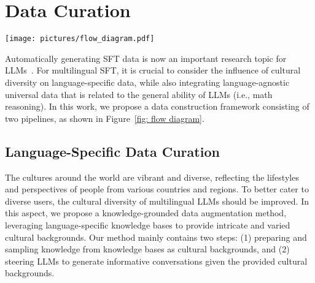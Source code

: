 \documentclass[11pt]{article}
\begin{document}
\section{Data Curation}
\begin{figure*}[t]
    \centering
    \texttt{[image: pictures/flow\_diagram.pdf]}
    \caption{The proposed data augmentation method consists of two pipelines. The upper pipeline illustrates the generation of language-specific chat data. Dialogues are generated by LLMs, conditioning on language-specific knowledge extracted from Wikipedia. The language-agnostic pipeline aims to leverage existing high-quality English SFT data, using a two-stage translation mechanism to mitigate translation errors stemming from cultural differences.}
    \label{fig: flow diagram}
\end{figure*}

Automatically generating SFT data is now an important research topic for LLMs~\cite{alpaca,wang-etal-2023-self-instruct,ding-etal-2023-enhancing}. For multilingual SFT, it is crucial to consider the influence of cultural diversity on language-specific data, while also integrating language-agnostic universal data that is related to the general ability of LLMs (i.e., math reasoning). In this work, we propose a data construction framework consisting of two pipelines, as shown in Figure~\ref{fig: flow diagram}. 

\subsection{Language-Specific Data Curation}

The cultures around the world are vibrant and diverse, reflecting the lifestyles and perspectives of people from various countries and regions. To better cater to diverse users, the cultural diversity of multilingual LLMs should be improved. In this aspect, we propose a knowledge-grounded data augmentation method, leveraging language-specific knowledge bases to provide intricate and varied cultural backgrounds. Our method mainly contains two steps: (1) preparing and sampling knowledge from knowledge bases as cultural backgrounds, and (2) steering LLMs to generate informative conversations given the provided cultural backgrounds.
\end{document}
